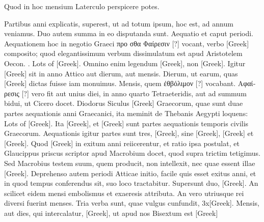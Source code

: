 Quod in hoc mensium
Laterculo perspicere potes.

\begin{table}[htbp]

\end{table}

Partibus anni explicatis, superest, ut ad
totum ipsum, hoc est, ad annum veniamus.
Duo autem summa in eo disputanda
sunt.
Aequatio et caput periodi.
Aequationem
hoc in negotio Graeci \textgreek{προ σθα Φαίρεσιν [?]}
vocant, verbo \textgreek{[Greek]}
composito; quod elegantissimum verbum
dissimulatum est apud Aristotelem Oecon.
. \textgreek{Lots of [Greek]}.
Omnino enim legendum
\textgreek{[Greek]}, non \textgreek{[Greek]}.
Igitur
\textgreek{[Greek]} sit in anno Attico aut dierum, aut
mensis.
Dierum, ut earum, quas \textgreek{[Greek]}
dictas fuisse iam monuimus.
Mensis, quem \textgreek{ἐθβόλιμον [?]} vocabant.
\textgreek{Αφαίρεσις [?]} vero fit aut unius diei, in anno
quarto Tetraeteridis, aut ad summum bidui,
ut Cicero docet.
Diodorus Siculus \textgreek{[Greek]}
Graecorum, quae
sunt duae partes aequationis anni Graecanici,
ita meminit de Thebanis Aegypti loquens:
\textgreek{Lots of [Greek]}.
Ita \textgreek{[Greek]}, et
\textgreek{[Greek]} sunt partes aequationis temporis civilis Graecorum.
Aequationis igitur partes sunt tres, \textgreek{[Greek]},
 sine \textgreek{[Greek]},
\textgreek{[Greek]} et \textgreek{[Greek]}.
Quod \textgreek{[Greek]} in exitum anni reiicerentur,
et ratio ipsa postulat, et Glaucippus priscus scriptor apud
Macrobium docet, quod supra trictim tetigimus.
Sed Macrobius testem
suum, quem producit, non intellexit, nec quae essent illae \textgreek{[Greek]}.
Deprehenso autem periodi Atticae
initio, facile quis esset exitus anni, et in quod tempus conferendus
sit, suo loco tractabitur.
Supersunt duo, \textgreek{[Greek]}.
An scilicet eidem mensi embolismus et exaeresis attributa.
An
vero utriusque rei diversi fuerint menses.
Tria verba sunt, quae vulgus
cunfundit, \textgreek{3x[Greek]}.
Mensis, aut
dies, qui intercalatur, \textgreek{[Greek]}, ut apud nos Bisextum est
 \textgreek{[Greek]}

